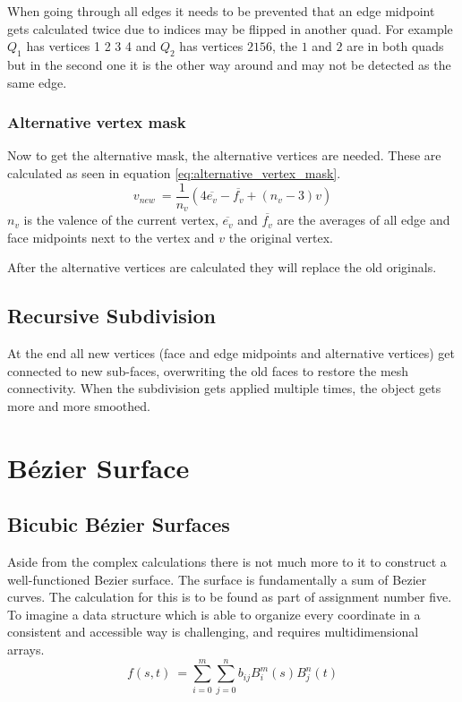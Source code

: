 \documentclass[11.5pt,oneside,a4paper]{scrartcl}
\newcounter{ct}
\begin{document}
When going through all edges it needs to be prevented that an edge midpoint gets calculated twice due to indices may be flipped in another quad. For example $Q_1$ has vertices 1 2 3 4 and $Q_2$ has vertices $2 1 5 6$, the $1$ and $2$ are in both quads but in the second one it is the other way around and may not be detected as the same edge.

\vspace{0.2cm}

\subsubsection{Alternative vertex mask}
Now to get the alternative mask, the alternative vertices are needed. These are calculated as seen in equation \ref{eq:alternative_vertex_mask}.
\begin{equation} \label{eq:alternative_vertex_mask}
        v_{new} \ = \frac{1}{n_{v}} ( 4 \overline{e_{v}} - \overline{f_{v}} + (n_{v}-3) v)
\end{equation} 
$n_{v}$ is the valence of the current vertex, $\overline{e_{v}}$ and $\overline{f_{v}}$ are the averages of all edge and face midpoints next to the vertex and $v$ the original vertex.

After the alternative vertices are calculated they will replace the old originals.

\subsection{Recursive Subdivision}
At the end all new vertices (face and edge midpoints and alternative vertices) get connected to new sub-faces, overwriting the old faces to restore the mesh connectivity. When the subdivision gets applied multiple times, the object gets more and more smoothed.

\newpage 

\section{Bézier Surface}
\subsection{Bicubic Bézier Surfaces}

Aside from the complex calculations there is not much more to it to construct a well-functioned Bezier surface. The surface is fundamentally a sum of Bezier curves. The calculation for this is to be found as part of assignment number five. To imagine a data structure which is able to organize every coordinate in a consistent and accessible way is challenging, and requires multidimensional arrays.
\begin{equation} 
\label{eq:bezier_surface}
        f(s, t) \ = \sum_{i=0}^m \sum_{j=0}^n b_{ij} B_{i}^m(s) B_{j}^n(t)
\end{equation} 
\end{document}
